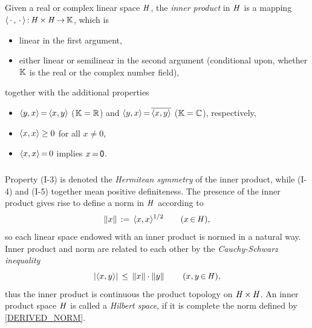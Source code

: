 \documentclass[11pt,twoside]{article}
\begin{document}
\subparagraph{}
Given a real or complex linear space $\mathit{H}$,
the \textit{inner product} in $\mathit{H}$ is a mapping
$\langle \,\cdot\,,\,\cdot\, \rangle {\,:\,} \mathit{H} {\,\times\,} \mathit{H} {\,\to\,} {\mathbb{K}}$,
which is

\begin{itemize}[leftmargin=15mm]
\item[(I-1)]
linear in the first argument,

\item[(I-2)]
either linear or semilinear in the second argument (conditional upon,
whether ${\mathbb{K}}$ is the real or the complex number field),
\end{itemize}
together with the additional properties

\begin{itemize}[leftmargin=15mm]
\item[(I-3)]
$\langle y,x \rangle {\,=\,}           \langle x,y \rangle$  (${\mathbb{K}}={\mathbb{R}}$) and
$\langle y,x \rangle {\,=\,} \overline{\langle x,y \rangle}$ (${\mathbb{K}}={\mathbb{C}}$), respectively,
\item[(I-4)]
$\langle x,x \rangle \geq 0$ for all $x \neq 0$,
\item[(I-5)]
$\langle x,x \rangle {\,=\,} 0$ implies $x {\,=\,} {\mathsf{0}}$.
\end{itemize}

\subparagraph{}
Property (I-3) is denoted the \textit{Hermitean symmetry} of the inner product,
while (I-4) and (I-5) together mean positive definiteness.
The presence of the inner product gives rise to define a norm in $\mathit{H}$
according to
\begin{equation}\label{DERIVED_NORM}
\left\lVert x \right\rVert \,:=\, \langle x,x \rangle ^{1/2} \quad \quad (x {\,\in\,} \mathit{H}),
\end{equation}
so each linear space endowed with an inner product is normed in a natural way.
Inner product and norm are related to each other
by the \textit{Cauchy-Schwarz} \textit{inequality}
\begin{equation}\label{CAUCHY_SCHWARZ_INEQUALITY}
\abs{\scalar{x}{y}} \, \leq \,
\norm{x} \cdot \norm{y} \quad \quad (x,y \xeof \hilH),
\end{equation}
thus the inner product is continuous
{\wrt} the product topology on $\mathit{H} {\,\times\,} \mathit{H}$.
An inner product space $\mathit{H}$ is called a \textit{Hilbert space},
if it is complete {\wrt} the norm defined by \eqref{DERIVED_NORM}.
\end{document}
